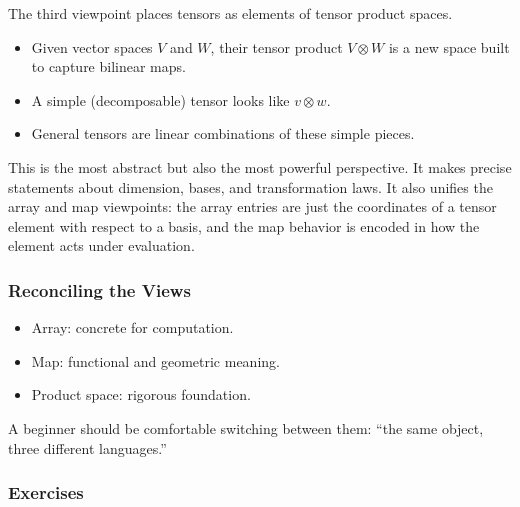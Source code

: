 \documentclass[
  letterpaper,
  DIV=11,
  numbers=noendperiod]{scrreprt}
\providecommand{\tightlist}{%
  \setlength{\itemsep}{0pt}\setlength{\parskip}{0pt}}
\begin{document}
The third viewpoint places tensors as elements of tensor product spaces.

\begin{itemize}
\tightlist
\item
  Given vector spaces \(V\) and \(W\), their tensor product
  \(V \otimes W\) is a new space built to capture bilinear maps.
\item
  A simple (decomposable) tensor looks like \(v \otimes w\).
\item
  General tensors are linear combinations of these simple pieces.
\end{itemize}

This is the most abstract but also the most powerful perspective. It
makes precise statements about dimension, bases, and transformation
laws. It also unifies the array and map viewpoints: the array entries
are just the coordinates of a tensor element with respect to a basis,
and the map behavior is encoded in how the element acts under
evaluation.

\subsubsection{Reconciling the Views}\label{reconciling-the-views}

\begin{itemize}
\tightlist
\item
  Array: concrete for computation.
\item
  Map: functional and geometric meaning.
\item
  Product space: rigorous foundation.
\end{itemize}

A beginner should be comfortable switching between them: ``the same
object, three different languages.''

\subsubsection{Exercises}\label{exercises-1}
\end{document}
